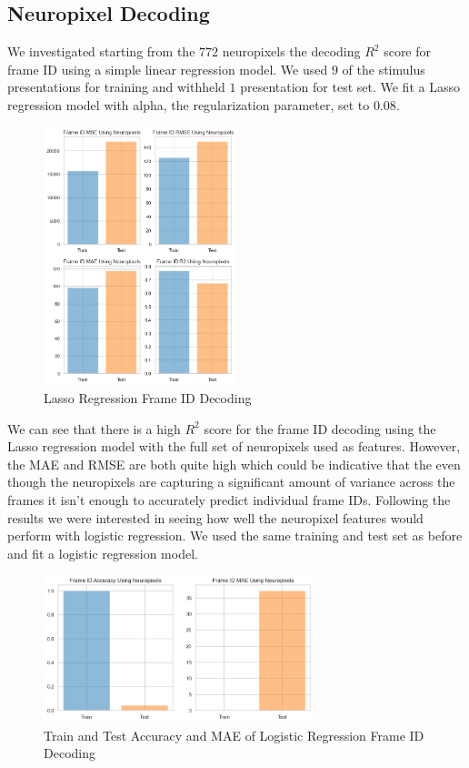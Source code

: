 \documentclass[12pt, letterpaper]{article}
\begin{document}
\subsection{Neuropixel Decoding}
\label{subsec:neuropixel_decoding}
We investigated starting from the $772$ neuropixels the decoding $R^2$ score for frame ID using a simple linear regression model. We used $9$ of the stimulus presentations for training and withheld $1$ presentation for test set. We fit a Lasso regression model with alpha, the regularization parameter, set to $0.08$. 
\begin{figure}[H]
    \centering
    \includegraphics[width=0.5\textwidth]{frame_id_metrics_lasso_.08.png}
    \caption{Lasso Regression Frame ID Decoding}
    \label{fig:lasso_frame_id}
\end{figure}
We can see that there is a high $R^2$ score for the frame ID decoding using the Lasso regression model with the full set of neuropixels used as features. However, the MAE and RMSE are both quite high which could be indicative that the even though the neuropixels are capturing a significant amount of variance across the frames it isn't enough to accurately predict individual frame IDs. Following the results we were interested in seeing how well the neuropixel features would perform with logistic regression. We used the same training and test set as before and fit a logistic regression model.

\begin{figure}[H]
    \centering
    \includegraphics[width=0.7\textwidth]{frame_id_metrics_logistic.png}
    \caption{Train and Test Accuracy and MAE of Logistic Regression Frame ID Decoding}
    \label{fig:neuropixel_logistic_frame_id}
\end{figure}
\end{document}
